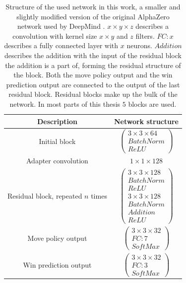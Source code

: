 \documentclass[12pt,onecolumn,oneside,titlepage]{article}
\begin{document}
\begin{table} [H]
 \centering
  \begin{tabular}{c | c }
   Description & Network structure \\
   \hline
   \hline
   Initial block & $\begin{pmatrix} 3 \times 3 \times 64 \\ BatchNorm \\ ReLU \end{pmatrix}$ \\
   \hline
   Adapter convolution & $1 \times 1 \times 128$ \\
   \hline
   Residual block, repeated $n$ times & $\begin{pmatrix} 3 \times 3 \times 128 \\ BatchNorm \\ ReLU \\ 3 \times 3 \times 128 \\ BatchNorm \\ Addition \\ ReLU \end{pmatrix}$ \\
   \hline 
   Move policy output & $\begin{pmatrix} 3 \times 3 \times 32 \\ FC: 7 \\ SoftMax \end{pmatrix}$ \\
   \hline
   Win prediction output & $\begin{pmatrix} 3 \times 3 \times 32 \\ FC: 3 \\ SoftMax \end{pmatrix}$
  \end{tabular}
  \caption{Structure of the used network in this work, a smaller and slightly modified version of the original AlphaZero network used by DeepMind \cite{silver2018general}.
  $x \times y \times z$ describes a convolution with kernel size $x \times y$ and $z$ filters. $FC: x$ describes a fully connected layer with $x$ neurons. $Addition$ describes the addition with the input of the residual block the addition is a part of, forming the residual structure of the block.
  Both the move policy output and the win prediction output are connected 
  to the output of the last residual block. Residual blocks make up the bulk of the network. In most parts of this thesis $5$ blocks are used.}
  \label{fig:blocks_network}
\end{table}
\end{document}

